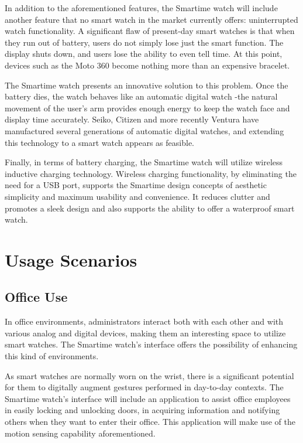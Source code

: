 \documentclass{article}
\begin{document}
In addition to the aforementioned features, the Smartime watch will include another feature that no smart watch in the market currently offers: uninterrupted watch functionality. A significant flaw of present-day smart watches is that when they run out of battery, users do not simply lose just the smart function. The display shuts down, and users lose the ability to even tell time. At this point, devices such as the Moto 360 become nothing more than an expensive bracelet. 

The Smartime watch presents an innovative solution to this problem. Once the battery dies, the watch behaves like an automatic digital watch -the natural movement of the user's arm provides enough energy to keep the watch face and display time accurately. Seiko, Citizen and more recently Ventura have manufactured several generations of automatic digital watches, and extending this technology to a smart watch appears as feasible.

Finally, in terms of battery charging, the Smartime watch will utilize wireless inductive charging technology. Wireless charging functionality, by eliminating the need for a USB port, supports the Smartime design concepts of aesthetic simplicity and maximum usability and convenience. It reduces clutter and promotes a sleek design and also supports the ability to offer a waterproof smart watch.

\section{Usage Scenarios}
\subsection{Office Use}
In office environments, administrators interact both with each other and with various analog and digital devices, making them an interesting space to utilize smart watches.  The Smartime watch's interface offers the possibility of enhancing this kind of environments. \cite{bernaerts2014office}

As smart watches are normally worn on the wrist, there is a significant potential for them to digitally augment gestures performed in day-to-day contexts. The Smartime watch's interface will include an application to assist office employees in easily locking and unlocking doors, in acquiring information and notifying others when they want to enter their office. This application will make use of the motion sensing capability aforementioned. 
\end{document}
